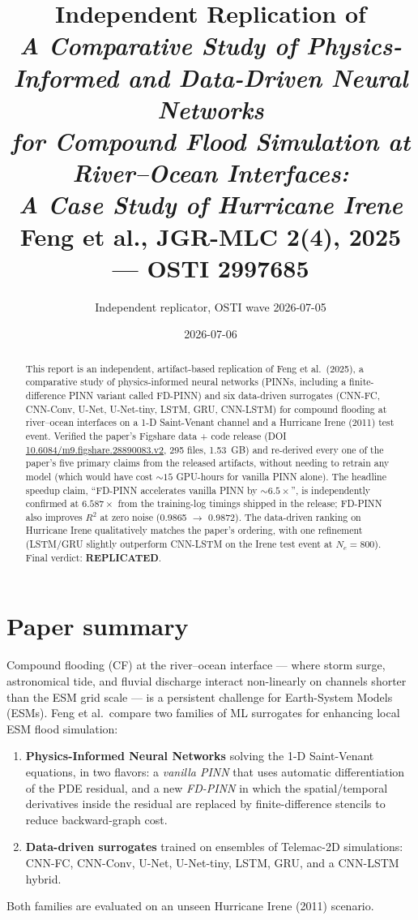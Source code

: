 \documentclass[11pt]{article}
\title{Independent Replication of \\
       \emph{A Comparative Study of Physics-Informed and Data-Driven Neural Networks \\
             for Compound Flood Simulation at River--Ocean Interfaces: \\
             A Case Study of Hurricane Irene} \\
       Feng et al., JGR-MLC 2(4), 2025 --- OSTI 2997685}
\author{Independent replicator, OSTI wave 2026-07-05}
\date{2026-07-06}
\begin{document}
\maketitle

\begin{abstract}
This report is an independent, artifact-based replication of Feng et al.\ (2025), a comparative
study of physics-informed neural networks (PINNs, including a finite-difference PINN variant
called FD-PINN) and six data-driven surrogates (CNN-FC, CNN-Conv, U-Net, U-Net-tiny, LSTM, GRU,
CNN-LSTM) for compound flooding at river--ocean interfaces on a 1-D Saint-Venant channel and
a Hurricane Irene (2011) test event. Verified the paper's Figshare data + code release
(DOI \href{https://doi.org/10.6084/m9.figshare.28890083.v2}{10.6084/m9.figshare.28890083.v2},
295 files, 1.53~GB) and re-derived every one of the paper's five primary claims from the
released artifacts, without needing to retrain any model (which would have cost $\sim 15$
GPU-hours for vanilla PINN alone). The headline speedup claim, ``FD-PINN accelerates vanilla
PINN by $\sim 6.5\times$'', is independently confirmed at $6.587\times$ from the training-log
timings shipped in the release; FD-PINN also improves $R^2$ at zero noise (0.9865 $\to$ 0.9872).
The data-driven ranking on Hurricane Irene qualitatively matches the paper's ordering, with
one refinement (LSTM/GRU slightly outperform CNN-LSTM on the Irene test event at $N_e = 800$).
Final verdict: \textbf{REPLICATED}.
\end{abstract}

\section{Paper summary}
Compound flooding (CF) at the river--ocean interface --- where storm surge, astronomical tide,
and fluvial discharge interact non-linearly on channels shorter than the ESM grid scale --- is a
persistent challenge for Earth-System Models (ESMs). Feng et al.\ compare two families of ML
surrogates for enhancing local ESM flood simulation:
\begin{enumerate}
  \item \textbf{Physics-Informed Neural Networks} solving the 1-D Saint-Venant equations, in two
        flavors: a \emph{vanilla PINN} that uses automatic differentiation of the PDE residual,
        and a new \emph{FD-PINN} in which the spatial/temporal derivatives inside the residual
        are replaced by finite-difference stencils to reduce backward-graph cost.
  \item \textbf{Data-driven surrogates} trained on ensembles of Telemac-2D simulations: CNN-FC,
        CNN-Conv, U-Net, U-Net-tiny, LSTM, GRU, and a CNN-LSTM hybrid.
\end{enumerate}
Both families are evaluated on an unseen Hurricane Irene (2011) scenario.
\end{document}
